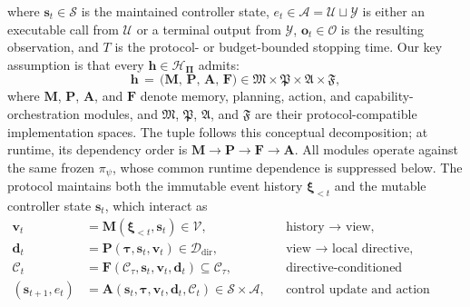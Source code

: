 \documentclass{article}
\begin{document}
where $\mathbf{s}_t\in\mathcal{S}$ is the maintained controller state, $e_t\in\mathcal{A}=\mathcal{U}\sqcup\mathcal{Y}$ is either an executable call from $\mathcal{U}$ or a terminal output from $\mathcal{Y}$, $\mathbf{o}_t\in\mathcal{O}$ is the resulting observation, and $T$ is the protocol- or budget-bounded stopping time. Our key assumption is that every $\mathbf{h}\in\mathcal{H}_{\boldsymbol{\Pi}}$ admits:
\begin{equation}
\label{eq:harness_decomp}
    \mathbf{h} \,=\, \bigl(\mathbf{M},\, \mathbf{P},\, \mathbf{A},\, \mathbf{F}\bigr)
    \in
    \mathfrak{M} \times \mathfrak{P} \times \mathfrak{A} \times \mathfrak{F},
\end{equation}
where $\mathbf{M}$, $\mathbf{P}$, $\mathbf{A}$, and $\mathbf{F}$ denote memory, planning, action, and capability-orchestration modules, and $\mathfrak{M}$, $\mathfrak{P}$, $\mathfrak{A}$, and $\mathfrak{F}$ are their protocol-compatible implementation spaces. The tuple follows this conceptual decomposition; at runtime, its dependency order is $\mathbf{M}\!\rightarrow\!\mathbf{P}\!\rightarrow\!\mathbf{F}\!\rightarrow\!\mathbf{A}$. All modules operate against the same frozen $\pi_{\psi}$, whose common runtime dependence is suppressed below.
The protocol maintains both the immutable event history $\boldsymbol{\xi}_{<t}$ and the mutable controller state $\mathbf{s}_t$, which interact as
\begin{equation}
\label{eq:module_dynamics}
\begin{aligned}
    \mathbf{v}_t &= \mathbf{M}(\boldsymbol{\xi}_{<t},\mathbf{s}_t) \in \mathcal{V},
    && \text{history $\to$ view,} \\
    \mathbf{d}_t &= \mathbf{P}(\boldsymbol{\tau},\mathbf{s}_t,\mathbf{v}_t) \in \mathcal{D}_{\mathrm{dir}},
    && \text{view $\to$ local directive,} \\
    \mathcal{C}_t &= \mathbf{F}(\mathcal{C}_{\tau},\mathbf{s}_t,\mathbf{v}_t,\mathbf{d}_t) \subseteq \mathcal{C}_{\tau},
    && \text{directive-conditioned capability orchestration,} \\
    (\mathbf{s}_{t+1},e_t) &= \mathbf{A}(\mathbf{s}_t,\boldsymbol{\tau},\mathbf{v}_t,\mathbf{d}_t,\mathcal{C}_t) \in \mathcal{S}\times\mathcal{A},
    && \text{control update and action emission,}
\end{aligned}
\end{equation}
\end{document}
